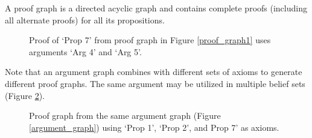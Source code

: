 \documentclass[a4paper]{article}
\begin{document}
A proof graph is a directed acyclic graph and contains complete proofs (including all alternate proofs) for all its propositions.

\begin{figure}[htbp]
\begin{center}
\caption{Proof of `Prop 7' from proof graph in Figure \ref{proof_graph1} uses arguments `Arg 4' and `Arg 5'.}
\label{proof_prop7}
\end{center}
\end{figure}

Note that an argument graph combines with different sets of axioms to generate different proof graphs. The same argument may be utilized in multiple belief sets (Figure \ref{proof_graph2}).

\begin{figure}[htbp]
\begin{center}
\caption{Proof graph from the same argument graph (Figure \ref{argument_graph}) using `Prop 1', `Prop 2', and Prop 7' as axioms.}
\label{proof_graph2}
\end{center}
\end{figure}
\end{document}
